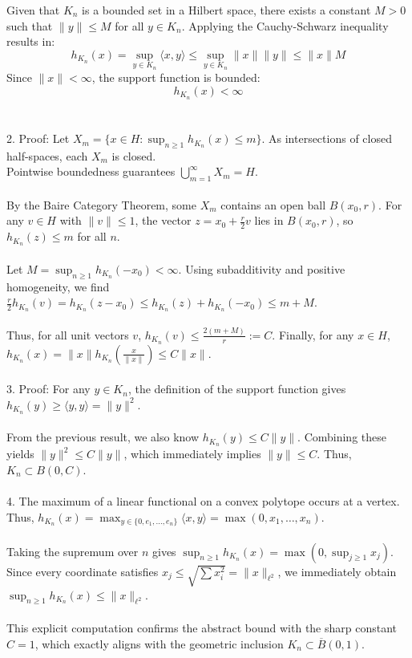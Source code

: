 \documentclass{article}
\begin{document}
 Given that $K_n$ is a bounded set in a Hilbert space, there exists a constant $M > 0$ such that $\|y\| \leq M$ for all $y \in K_n$. Applying the Cauchy-Schwarz inequality results in:
\[
 h_{K_n}(x) = \sup_{y \in K_n} \langle x, y \rangle \leq \sup_{y \in K_n} \|x\| \|y\| \leq \|x\| M
\]
 Since $\|x\| < \infty$, the support function is bounded:
\[
h_{K_n}(x) < \infty
 \]
\\
\\
2. Proof: Let $X_m = \{ x \in H : \sup_{n \ge 1} h_{K_n}(x) \le m \}$. As intersections of closed half-spaces, each $X_m$ is closed. 
\\
Pointwise boundedness guarantees $\bigcup_{m=1}^\infty X_m = H$.
\\
\\
By the Baire Category Theorem, some $X_m$ contains an open ball $B(x_0, r)$. For any $v \in H$ with $\|v\| \le 1$, the vector $z = x_0 + \frac{r}{2}v$ lies in $B(x_0, r)$, so $h_{K_n}(z) \le m$ for all $n$. 
\\
\\
Let $M = \sup_{n \ge 1} h_{K_n}(-x_0) < \infty$. Using subadditivity and positive homogeneity, we find $\frac{r}{2}h_{K_n}(v) = h_{K_n}(z - x_0) \le h_{K_n}(z) + h_{K_n}(-x_0) \le m + M$. 
\\
\\
Thus, for all unit vectors $v$, $h_{K_n}(v) \le \frac{2(m+M)}{r} := C$. Finally, for any $x \in H$, $h_{K_n}(x) = \|x\|h_{K_n}\left(\frac{x}{\|x\|}\right) \le C\|x\|$. 
\\
\\
3. Proof: For any $y \in K_n$, the definition of the support function gives $h_{K_n}(y) \geq \langle y, y \rangle = \|y\|^2$.
\\
\\
From the previous result, we also know $h_{K_n}(y) \leq C\|y\|$. Combining these yields $\|y\|^2 \leq C\|y\|$, which immediately implies $\|y\| \leq C$. Thus, $K_n \subset B(0, C)$. 
\\
\\
4. The maximum of a linear functional on a convex polytope occurs at a vertex. Thus, $h_{K_n}(x) = \max_{y \in \{0, e_1, \dots, e_n\}} \langle x, y \rangle = \max(0, x_1, \dots, x_n)$.
\\
\\
Taking the supremum over $n$ gives $\sup_{n \ge 1} h_{K_n}(x) = \max(0, \sup_{j \ge 1} x_j)$.
\\
Since every coordinate satisfies $x_j \le \sqrt{\sum x_i^2} = \|x\|_{\ell^2}$, we immediately obtain $\sup_{n \ge 1} h_{K_n}(x) \le \|x\|_{\ell^2}$.
\\
\\
This explicit computation confirms the abstract bound with the sharp constant $C=1$, which exactly aligns with the geometric inclusion $K_n \subset \overline{B}(0,1)$.
\end{document}
